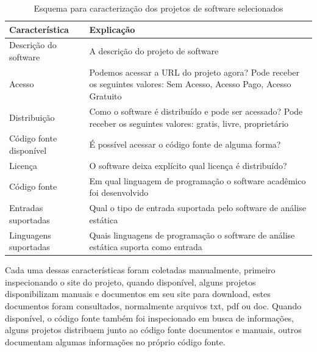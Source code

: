 
\begin{table}[h]
\caption{Esquema para caracterização dos projetos de software selecionados}
\centering
\begin{tabular}{ l p{11cm} }
  \hline
  Característica           & Explicação \\
  \hline
  Descrição do software    & A descrição do projeto de software \\
  Acesso                   & Podemos acessar a URL do projeto agora? Pode receber os seguintes valores: Sem Acesso, Acesso Pago, Acesso Gratuito \\
  Distribuição             & Como o software é distribuído e pode ser acessado? Pode receber os seguintes valores: gratis, livre, proprietário \\
  Código fonte disponível  & É possível acessar o código fonte de alguma forma? \\
  Licença                  & O software deixa explícito qual licença é distribuído? \\
  Código fonte             & Em qual linguagem de programação o software acadêmico foi desenvolvido \\
  Entradas suportadas      & Qual o tipo de entrada suportada pelo software de análise estática \\
  Linguagens suportadas    & Quais linguagens de programação o software de análise estática suporta como entrada \\
  \hline
\end{tabular}
\label{esquema-caracteristicas}
\end{table}

Cada uma dessas características foram coletadas manualmente, primeiro
inspecionando o site do projeto, quando disponível, alguns projetos
disponibilizam manuais e documentos em seu site para download, estes documentos
foram consultados, normalmente arquivos txt, pdf ou doc. Quando disponível,
o código fonte também foi inspecionado em busca de informações, alguns projetos
distribuem junto ao código fonte documentos e manuais, outros documentam
algumas informações no próprio código fonte.

